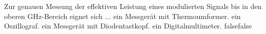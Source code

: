     {Zur genauen Messung der effektiven Leistung eines modulierten Signals bis in den oberen GHz-Bereich eignet sich ...}
    {ein Messgerät mit Thermoumformer.}
    {ein Oszillograf.}
    {ein Messgerät mit Diodentastkopf.}
    {ein Digitalmultimeter.}
    {false}{false}